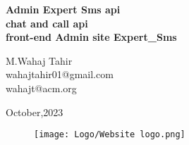 \begin{Titlepage}
\begin{center}
    \vspace*{2cm}
    
    \textbf{\Huge Admin Expert Sms api\\chat and call api\\front-end Admin site Expert\_Sms }\\
    \vspace*{2cm}
    
      
      \vspace{0.2cm}
      \begin{center}
          \large M.Wahaj Tahir\\wahajtahir01@gmail.com\\wahajt@acm.org
      \end{center} 
    
    \vspace{1.5cm}
    \begin{center}
    \large October,2023 
    \end{center}
    
    \vfill
    \vspace{0.8cm}
    \begin{figure}[hb]
        \centering
        \texttt{[image: Logo/Website logo.png]}
    \end{figure}
    \end{center}
\end{Titlepage}








